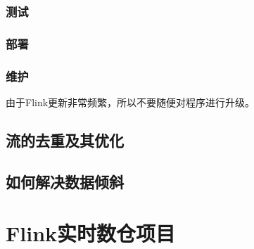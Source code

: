 \documentclass[cn,11pt,chinese]{elegantbook}
\begin{document}
\section{测试}

\section{部署}

\section{维护}

由于Flink更新非常频繁，所以不要随便对程序进行升级。

\chapter{流的去重及其优化}

\chapter{如何解决数据倾斜}

\part{Flink实时数仓项目}
\end{document}
